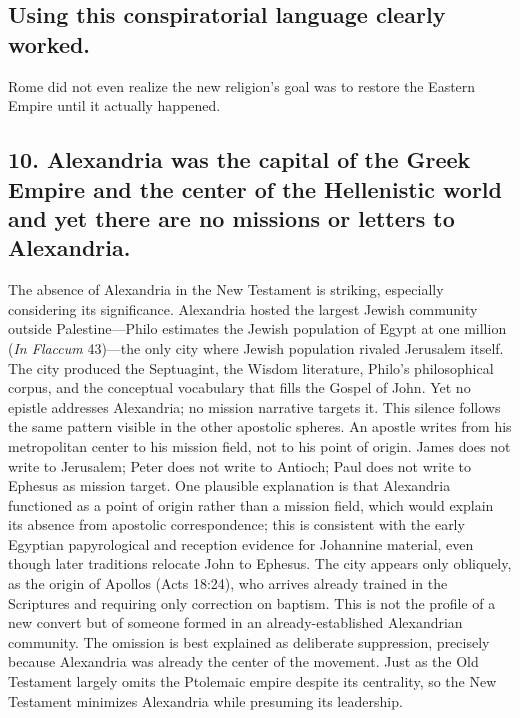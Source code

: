 \subsection{Using this conspiratorial language clearly worked.}\label{subsec:using-this-conspiratorial-language-clearly-worked}

Rome did not even realize the new religion's goal was to restore the Eastern Empire until it actually happened.

\subsection{10.
Alexandria was the capital of the Greek Empire and the center of the Hellenistic world and yet there are no missions or letters to Alexandria.}\label{subsec:alexandria-was-the-capital-of-the-greek-empire-and-the-center-of-the-hellenistic-world-and-yet-there-are-no-missions-or-letters-to-alexandria.}

The absence of Alexandria in the New Testament is striking, especially considering its significance.
Alexandria hosted the largest Jewish community outside Palestine---Philo estimates the Jewish population of Egypt at one million (\emph{In Flaccum} 43)---the only city where Jewish population rivaled Jerusalem itself.
The city produced the Septuagint, the Wisdom literature, Philo's philosophical corpus, and the conceptual vocabulary that fills the Gospel of John.
Yet no epistle addresses Alexandria; no mission narrative targets it.
This silence follows the same pattern visible in the other apostolic spheres.
An apostle writes from his metropolitan center to his mission field, not to his point of origin.
James does not write to Jerusalem; Peter does not write to Antioch; Paul does not write to Ephesus as mission target.
One plausible explanation is that Alexandria functioned as a point of origin rather than a mission field, which would explain its absence from apostolic correspondence; this is consistent with the early Egyptian papyrological and reception evidence for Johannine material, even though later traditions relocate John to Ephesus.
The city appears only obliquely, as the origin of Apollos (Acts 18:24), who arrives already trained in the Scriptures and requiring only correction on baptism.
This is not the profile of a new convert but of someone formed in an already-established Alexandrian community.
The omission is best explained as deliberate suppression, precisely because Alexandria was already the center of the movement.
Just as the Old Testament largely omits the Ptolemaic empire despite its centrality, so the New Testament minimizes Alexandria while presuming its leadership.

